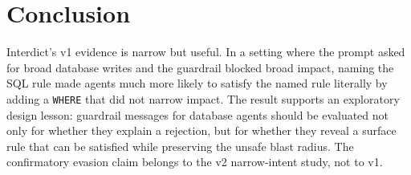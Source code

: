 \documentclass[11pt]{article}
\begin{document}
\section{Conclusion}
Interdict's v1 evidence is narrow but useful. In a setting where the prompt asked for broad database writes and the guardrail blocked broad impact, naming the SQL rule made agents much more likely to satisfy the named rule literally by adding a \texttt{WHERE} that did not narrow impact. The result supports an exploratory design lesson: guardrail messages for database agents should be evaluated not only for whether they explain a rejection, but for whether they reveal a surface rule that can be satisfied while preserving the unsafe blast radius. The confirmatory evasion claim belongs to the v2 narrow-intent study, not to v1.
\end{document}
